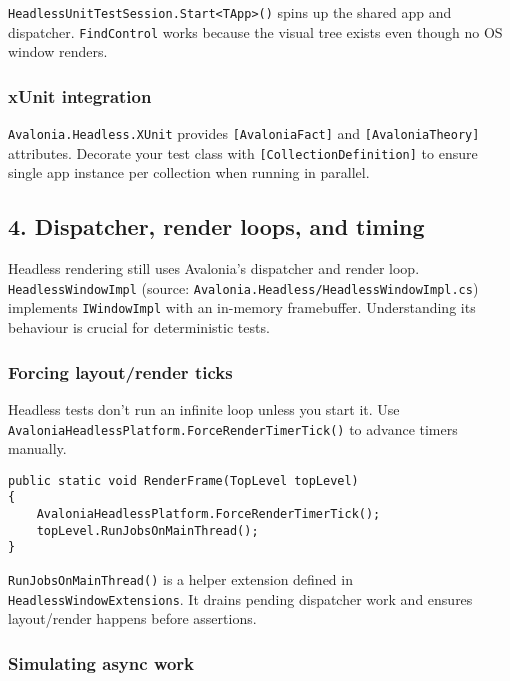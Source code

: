 \passthrough{\lstinline!HeadlessUnitTestSession.Start<TApp>()!} spins up
the shared app and dispatcher. \passthrough{\lstinline!FindControl!}
works because the visual tree exists even though no OS window renders.

\subsubsection{xUnit integration}\label{xunit-integration}

\passthrough{\lstinline!Avalonia.Headless.XUnit!} provides
\passthrough{\lstinline![AvaloniaFact]!} and
\passthrough{\lstinline![AvaloniaTheory]!} attributes. Decorate your
test class with \passthrough{\lstinline![CollectionDefinition]!} to
ensure single app instance per collection when running in parallel.

\subsection{4. Dispatcher, render loops, and
timing}\label{dispatcher-render-loops-and-timing}

Headless rendering still uses Avalonia's dispatcher and render loop.
\passthrough{\lstinline!HeadlessWindowImpl!} (source:
\passthrough{\lstinline!Avalonia.Headless/HeadlessWindowImpl.cs!})
implements \passthrough{\lstinline!IWindowImpl!} with an in-memory
framebuffer. Understanding its behaviour is crucial for deterministic
tests.

\subsubsection{Forcing layout/render
ticks}\label{forcing-layoutrender-ticks}

Headless tests don't run an infinite loop unless you start it. Use
\passthrough{\lstinline!AvaloniaHeadlessPlatform.ForceRenderTimerTick()!}
to advance timers manually.

\begin{lstlisting}
public static void RenderFrame(TopLevel topLevel)
{
    AvaloniaHeadlessPlatform.ForceRenderTimerTick();
    topLevel.RunJobsOnMainThread();
}
\end{lstlisting}

\passthrough{\lstinline!RunJobsOnMainThread()!} is a helper extension
defined in \passthrough{\lstinline!HeadlessWindowExtensions!}. It drains
pending dispatcher work and ensures layout/render happens before
assertions.

\subsubsection{Simulating async work}\label{simulating-async-work}

